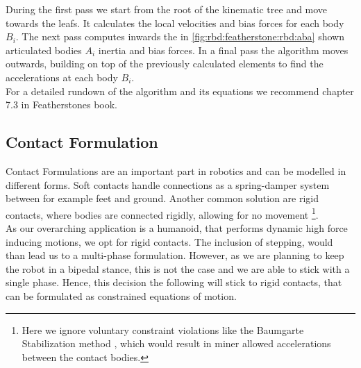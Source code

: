 During the first pass we start from the root of the kinematic tree and move towards the leafs.
It calculates the local velocities and bias forces for each body $B_i$.
The next pass computes inwards the in \cref{fig:rbd:featherstone:rbd:aba} shown articulated bodies $A_i$ inertia and bias forces.
In a final pass the algorithm moves outwards, building on top of the previously calculated elements to find the accelerations at each body $B_i$.
\\
For a detailed rundown of the algorithm and its equations we recommend chapter 7.3 in Featherstones book.
%
%
\subsection{Contact Formulation} \label{sec:fundamentals:contacts}
Contact Formulations are an important part in robotics and can be modelled in different forms.
Soft contacts handle connections as a spring-damper system between for example feet and ground.
Another common solution are rigid contacts, where bodies are connected rigidly, allowing for no movement \footnote{Here we ignore voluntary constraint violations like the Baumgarte Stabilization method \cite{flores_2010}, which would result in miner allowed accelerations between the contact bodies.}.
\\
As our overarching application is a humanoid, that performs dynamic high force inducing motions, we opt for rigid contacts.
The inclusion of stepping, would than lead us to a multi-phase formulation.
However, as we are planning to keep the robot in a bipedal stance, this is not the case and we are able to stick with a single phase.
Hence, this decision the following will stick to rigid contacts, that can be formulated as constrained equations of motion.


